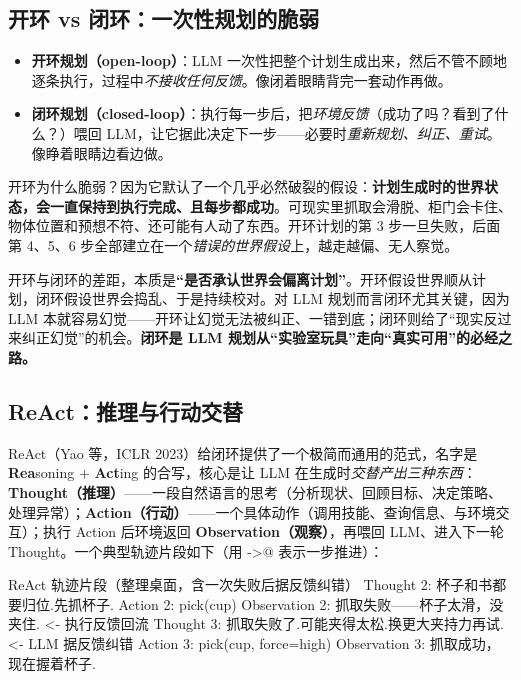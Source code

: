 \subsection{开环 vs 闭环：一次性规划的脆弱}
\label{sec:openvsclosed}

\begin{itemize}
  \item \textbf{开环规划（open-loop）}：LLM 一次性把整个计划生成出来，然后不管不顾地逐条执行，过程中\emph{不接收任何反馈}。像闭着眼睛背完一套动作再做。
  \item \textbf{闭环规划（closed-loop）}：执行每一步后，把\emph{环境反馈}（成功了吗？看到了什么？）喂回 LLM，让它据此决定下一步——必要时\emph{重新规划、纠正、重试}。像睁着眼睛边看边做。
\end{itemize}

\noindent 开环为什么脆弱？因为它默认了一个几乎必然破裂的假设：\textbf{计划生成时的世界状态，会一直保持到执行完成、且每步都成功}。可现实里抓取会滑脱、柜门会卡住、物体位置和预想不符、还可能有人动了东西。开环计划的第 3 步一旦失败，后面第 4、5、6 步全部建立在一个\emph{错误的世界假设}上，越走越偏、无人察觉。

\begin{insight}
开环与闭环的差距，本质是\textbf{“是否承认世界会偏离计划”}。开环假设世界顺从计划，闭环假设世界会捣乱、于是持续校对。对 LLM 规划而言闭环尤其关键，因为 LLM 本就容易幻觉——开环让幻觉无法被纠正、一错到底；闭环则给了“现实反过来纠正幻觉”的机会。\textbf{闭环是 LLM 规划从“实验室玩具”走向“真实可用”的必经之路。}
\end{insight}

\subsection{ReAct：推理与行动交替}
\label{sec:react}

ReAct（Yao 等，ICLR 2023）给闭环提供了一个极简而通用的范式，名字是 \textbf{Rea}soning $+$ \textbf{Act}ing 的合写，核心是让 LLM 在生成时\emph{交替产出三种东西}：\textbf{Thought（推理）}——一段自然语言的思考（分析现状、回顾目标、决定策略、处理异常）；\textbf{Action（行动）}——一个具体动作（调用技能、查询信息、与环境交互）；执行 Action 后环境返回 \textbf{Observation（观察）}，再喂回 LLM、进入下一轮 Thought。一个典型轨迹片段如下（用 \verb@->@ 表示一步推进）：

\begin{codebox}[text]{ReAct 轨迹片段（整理桌面，含一次失败后据反馈纠错）}
Thought 2: 杯子和书都要归位.先抓杯子.
Action  2: pick(cup)
Observation 2: 抓取失败——杯子太滑，没夹住.     <- 执行反馈回流
Thought 3: 抓取失败了.可能夹得太松.换更大夹持力再试.  <- LLM 据反馈纠错
Action  3: pick(cup, force=high)
Observation 3: 抓取成功，现在握着杯子.
\end{codebox}

